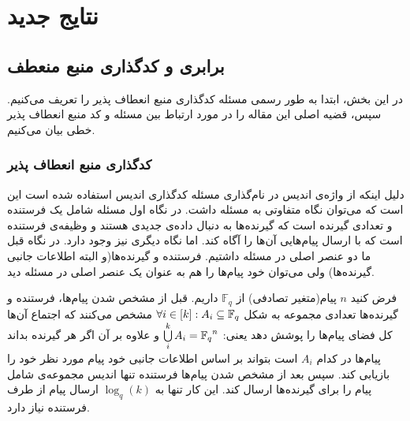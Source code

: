  
\section{نتایج جدید}
\label{sec3}
\subsection{
	برابری 
	\picod
	 و کدگذاری منبع منعطف
}
در این بخش، ابتدا به طور رسمی مسئله کدگذاری منبع انعطاف پذیر را تعریف می‌کنیم. سپس، قضیه اصلی این مقاله را در مورد ارتباط بین مسئله 
\picod
 و کد منبع انعطاف پذیر خطی بیان می‌کنیم.
\subsubsection{
		کدگذاری منبع انعطاف پذیر
}
\begin{recal}
	دلیل اینکه از واژه‌ی اندیس در نام‌گذاری مسئله کدگذاری اندیس استفاده شده است این است که می‌توان نگاه متفاوتی به مسئله داشت. در نگاه اول مسئله شامل یک فرستنده و تعدادی گیرنده است که گیرنده‌ها به دنبال داده‌ی جدیدی هستند و وظیفه‌ی فرستنده است که با ارسال پیام‌هایی آن‌ها را آگاه کند. اما نگاه دیگری نیز وجود دارد. در نگاه قبل ما دو عنصر اصلی در مسئله داشتیم. فرستنده و گیرنده‌ها(و البته اطلاعات جانبی گیرنده‌ها) ولی می‌توان خود پیام‌ها را هم به عنوان یک عنصر اصلی در مسئله دید.
	
فرض کنید 
$n$
پیام(متغیر‌ تصادفی) از
$\mathbb{F}_q$
 داریم. قبل از مشخص شدن پیام‌ها، فرستنده و گیرنده‌ها تعدادی مجموعه به شکل
 $\forall i \in [k]: A_i \subseteq {\mathbb{F}_q}$
 مشخص می‌کنند که اجتماع آن‌ها کل فضای پیام‌ها را پوشش دهد یعنی:
 $ \bigcup\limits_i^k A_i = {\mathbb{F}_q}^n $
 و علاوه بر آن اگر هر گیرنده بداند پیام‌ها در کدام
 $A_i$
 است بتواند بر اساس اطلاعات جانبی خود پیام مورد نظر خود را بازیابی کند. سپس بعد از مشخص شدن پیام‌ها فرستنده تنها اندیس مجموعه‌ی شامل پیام را برای گیرنده‌ها ارسال کند. این کار تنها به
 $\log_q(k)$
 ارسال پیام از طرف فرستنده نیاز دارد.
\end{recal}
